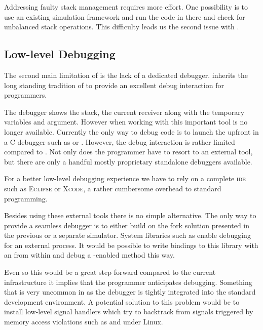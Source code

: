 Addressing faulty stack management requires more effort.
One possibility is to use an existing \ASM simulation framework and run the code in there and check for unbalanced stack operations.
This difficulty leads us the second issue with \B.

\subsection{Low-level Debugging}
The second main limitation of \B is the lack of a dedicated debugger.
\PH inherits the long standing tradition of \ST to provide an excellent debug interaction for programmers.

The \PH debugger shows the stack, the current receiver along with the temporary variables and argument.
However when working with \B this important tool is no longer available.
Currently the only way to debug \B code is to launch the \VM upfront in a C debugger such as \GDB or \LLDB.
However, the debug interaction is rather limited compared to \PH.
Not only does the programmer have to resort to an external tool, but there are only a handful mostly proprietary standalone debuggers available.

For a better low-level debugging experience we have to rely on a complete \textsc{ide} such as \textsc{Eclipse} or \textsc{Xcode}, a rather cumbersome overhead to standard \PH programming.

Besides using these external tools there is no simple alternative.
The only way to provide a seamless debugger is to either build on the fork solution presented in the previous  or a separate simulator.
System libraries such as \ptrace enable debugging for an external process.
It would be possible to write bindings to this library with an \FFI from within \PH and debug a \B-enabled method this way.

Even so this would be a great step forward compared to the current infrastructure it implies that the programmer anticipates debugging.
Something that is very uncommon in \PH as the debugger is tightly integrated into the standard development environment.
A potential solution to this problem would be to install low-level signal handlers which try to backtrack from signals triggered by memory access violations such as  and  under Linux.

